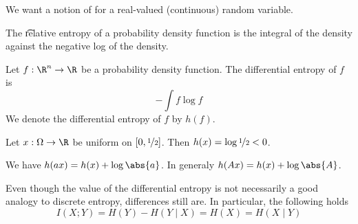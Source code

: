 

We want a notion of  for a real-valued (continuous) random variable.


The \t{relative entropy} of a probability density function is the integral of the density against the negative log of the density.


Let $f: \R^n \to \R$ be a probability density function.
The differential entropy of $f$ is
\[
  - \int f \log f
\]
We denote the differential entropy of $f$ by $h(f)$.


Let $x: \Omega \to \R$ be uniform on $[0, \nicefrac{1}{2}]$.
Then $h(x) = \log\nicefrac{1}{2} < 0$.


We have $h(ax) = h(x) + \log\abs{a}$.
In generaly $h(Ax) = h(x) + \log\abs{A}$.


Even though the value of the differential entropy is not necessarily a good analogy to discrete entropy, differences still are.
In particular, the following holds
\[
  I(X; Y) = H(Y) - H(Y \mid X) = H(X) = H(X \mid Y)
\]

\blankpage
